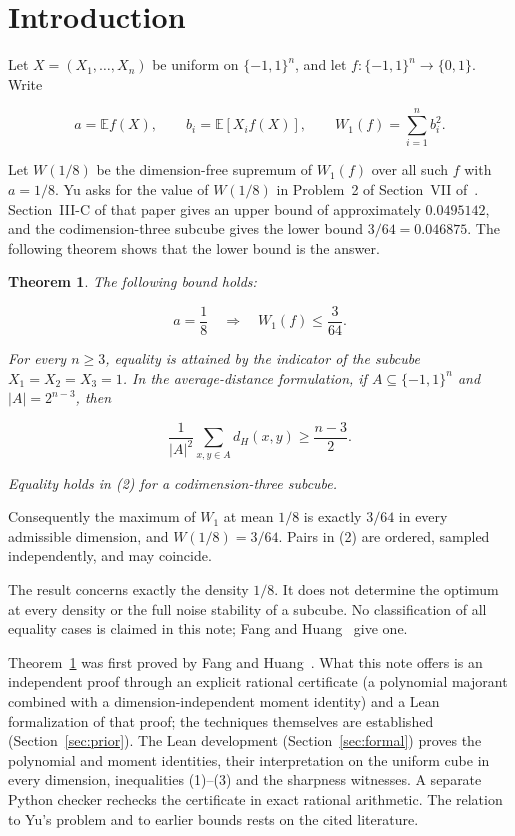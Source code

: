 \documentclass[11pt]{article}
\newtheorem{theorem}{Theorem}
\begin{document}
\section{Introduction}\label{result-and-scope}

Let \(X=(X_1,\ldots,X_n)\) be uniform on \(\{-1,1\}^n\), and let
\(f:\{-1,1\}^n\to\{0,1\}\). Write

\[a=\mathbb E f(X),\qquad b_i=\mathbb E[X_i f(X)],\qquad W_1(f)=\sum_{i=1}^n b_i^2.\]

Let \(W(1/8)\) be the dimension-free supremum of \(W_1(f)\) over all
such \(f\) with \(a=1/8\). Yu asks for the value of \(W(1/8)\) in
Problem~2 of Section~VII of~\cite{Y26}. Section~III-C of that paper
gives an upper bound of approximately \(0.0495142\), and the
codimension-three subcube gives the lower bound \(3/64=0.046875\). The
following theorem shows that the lower bound is the answer.

\begin{theorem}\label{thm:main}
The following bound holds:

\[\boxed{a=\frac18\quad\Longrightarrow\quad W_1(f)\le\frac3{64}.} \tag{1}\]

For every \(n\ge3\), equality is attained by the indicator of the
subcube \(X_1=X_2=X_3=1\). In the average-distance formulation, if
\(A\subseteq\{-1,1\}^n\) and \(|A|=2^{n-3}\), then

\[\boxed{\frac1{|A|^2}\sum_{x,y\in A}d_H(x,y)\ge\frac{n-3}{2}.} \tag{2}\]

Equality holds in (2) for a codimension-three subcube.
\end{theorem}

Consequently the maximum of \(W_1\) at mean \(1/8\) is exactly
\(3/64\) in every admissible dimension, and \(W(1/8)=3/64\). Pairs in
(2) are ordered, sampled independently, and may coincide.

The result concerns exactly the density \(1/8\). It does not determine
the optimum at every density or the full noise stability of a subcube.
No classification of all equality cases is claimed in this note; Fang and Huang~\cite{FH26} give one.

Theorem~\ref{thm:main} was first proved by Fang and Huang~\cite{FH26}.
What this note offers is an independent proof through an explicit
rational certificate (a polynomial majorant combined with a
dimension-independent moment identity) and a Lean formalization of
that proof; the techniques themselves are established
(Section~\ref{sec:prior}). The Lean development
(Section~\ref{sec:formal}) proves the polynomial and moment identities,
their interpretation on the uniform cube in every dimension,
inequalities (1)--(3) and the sharpness witnesses. A separate Python
checker rechecks the certificate in exact rational arithmetic. The
relation to Yu's problem and to earlier bounds rests on the cited
literature.
\end{document}
